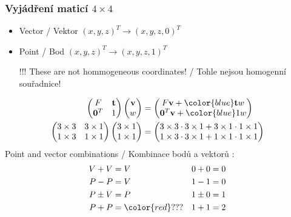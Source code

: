 \begin{frame}
    \frametitle{Vyjádření maticí $4\times4$}
    \begin{itemize}
        \item Vector / Vektor $(x,y,z)^T \rightarrow (x,y,z,0)^T$
        \item Point / Bod $(x,y,z)^T \rightarrow (x,y,z,1)^T$
        \item[\color{red}!!!] These are not hommogeneous coordinates! / Tohle nejsou homogenní souřadnice!
    \end{itemize}
    \pause
    \begin{align*}
        \begin{pmatrix}
            F & \V{t} \\
            \V{0}^T & 1
        \end{pmatrix}\begin{pmatrix}\V{v}\\w\end{pmatrix}
        &= \begin{pmatrix}
            F\V{v} + {\color{blue}\V{t}w} \\
            \V{0}^T\V{v} + {\color{blue}1w}
        \end{pmatrix} \\
        \begin{pmatrix}
            3\times3 & 3\times1 \\
            1\times3 & 1\times1
        \end{pmatrix}\begin{pmatrix}3\times1\\1\times1\end{pmatrix}
        &= \begin{pmatrix}
            3\times3 \cdot 3\times1 + 3\times1 \cdot 1\times1 \\
            1\times3 \cdot 3\times1 + 1\times1 \cdot 1\times1
        \end{pmatrix}
    \end{align*}
    \pause\vfill
    Point and vector combinations / Kombinace bodů a vektorů :
    \begin{align*}
        V + V &= V & 0+0 &= 0 \\
        P - P &= V & 1-1 &= 0 \\
        P \pm V &= P & 1\pm 0 &= 1 \\
        P + P &= \color{red}??? & 1+1 &= 2
    \end{align*}
\end{frame}



